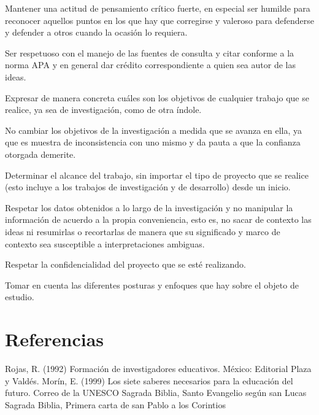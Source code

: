 Mantener una actitud de pensamiento crítico fuerte, en especial ser humilde para reconocer aquellos puntos en los que hay que corregirse y valeroso para defenderse y defender a otros cuando la ocasión lo requiera.

Ser respetuoso con el manejo de las fuentes de consulta y citar conforme a la norma APA y en general dar crédito correspondiente a quien sea autor de las ideas.

Expresar de manera concreta cuáles son los objetivos de cualquier trabajo que se realice, ya sea de investigación, como de otra índole.

No cambiar los objetivos de la investigación a medida que se avanza en ella, ya que es muestra de inconsistencia con uno mismo y da pauta a que la confianza otorgada demerite.

Determinar el alcance del trabajo, sin importar el tipo de proyecto que se realice (esto incluye a los trabajos de investigación y de desarrollo) desde un inicio.

Respetar los datos obtenidos a lo largo de la investigación y no manipular la información de acuerdo a la propia conveniencia, esto es, no sacar de contexto las ideas ni resumirlas o recortarlas de manera que su significado y marco de contexto sea susceptible a interpretaciones ambiguas.

Respetar la confidencialidad del proyecto que se esté realizando.

Tomar en cuenta las diferentes posturas y enfoques que hay sobre el objeto de estudio.

\section{Referencias}
Rojas, R. (1992) Formación de investigadores educativos. México: Editorial Plaza y Valdés.
Morín, E. (1999) Los siete saberes necesarios para la educación del futuro. Correo de la UNESCO
Sagrada Biblia, Santo Evangelio según san Lucas
Sagrada Biblia, Primera carta de san Pablo a los Corintios